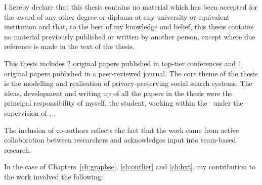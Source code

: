\begin{publicationdeclaration}
\noindent I hereby declare that this thesis contains no material which has been accepted for the award of any other degree or diploma at any university or equivalent institution and that, to the best of my knowledge and belief, this thesis contains no material previously published or written by another person, except where due reference is made in the text of the thesis. 

\noindent This thesis includes 2 original papers published in top-tier conferences and 1 original papers published in a peer-reviewed journal. The core theme of the thesis is the modelling and realisation of privacy-preserving social search systems. The ideas, development and writing up of all the papers in the thesis were the principal responsibility of myself, the student, working within the \facultyname~under the supervision of \supervisorname, \cosupervisorname.

\noindent The inclusion of co-authors reflects the fact that the work came from active collaboration between researchers and acknowledges input into team-based research.

\noindent In the case of Chapters~\ref{ch:graphse}, \ref{ch:outlier} and \ref{ch:hxt}, my contribution to the work involved the following:


\end{publicationdeclaration}

